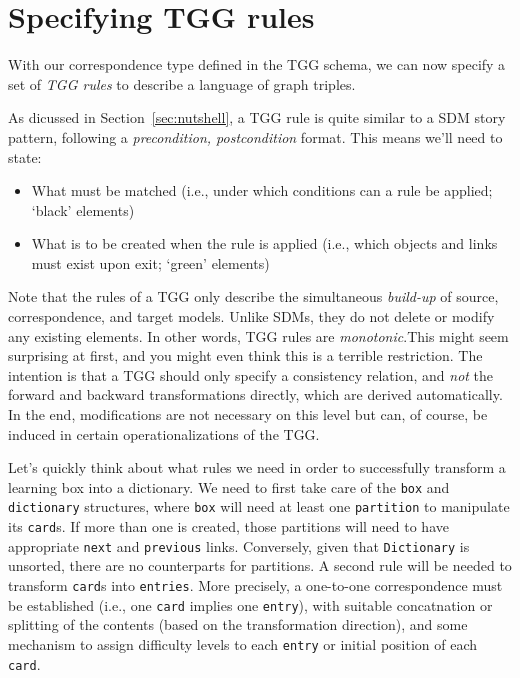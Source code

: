 \newpage
\hypertarget{sec:Rules}{}
\section{Specifying TGG rules}
\genHeader

With our correspondence type defined in the TGG schema, we can now specify a set of \emph{TGG rules} to describe a language of graph
triples.

As dicussed in Section~\ref{sec:nutshell}, a TGG rule is quite similar to a SDM story pattern, following a \emph{precondition, postcondition}
format. This means we'll need to state:

\begin{itemize}

\item What must be matched (i.e., under which conditions can a rule be applied; `black' elements)

\item What is to be created when the rule is applied (i.e., which objects and links must exist upon exit; `green' elements)

\end{itemize}

\vspace{0.5cm}

Note that the rules of a TGG only describe the simultaneous \emph{build-up} of source, correspondence, and target models. Unlike SDMs, they do not delete or
modify any existing elements. In other words, TGG rules are \emph{monotonic}.This might seem surprising at first, and you might even think
this is a terrible restriction. The intention is that a TGG should only specify a consistency relation, and \emph{not} the forward and backward transformations
directly, which are derived automatically. In the end, modifications are not necessary on this level but can, of course, be induced in certain
operationalizations of the TGG.

Let's quickly think about what rules we need in order to successfully transform a learning box into a dictionary. We need to first take care of the \texttt{box}
and \texttt{dictionary} structures, where \texttt{box} will need at least one \texttt{partition} to manipulate its \texttt{card}s. If more than one is created,
those partitions will need to have appropriate \texttt{next} and \texttt{previous} links. Conversely, given that \texttt{Dictionary} is unsorted, there are no
counterparts for partitions. A second rule will be needed to transform \texttt{card}s into \texttt{entries}. More precisely, a one-to-one correspondence must be
established (i.e., one \texttt{card} implies one \texttt{entry}), with suitable concatnation or splitting of the contents (based on the transformation
direction), and some mechanism to assign difficulty levels to each \texttt{entry} or initial position of each \texttt{card}.







